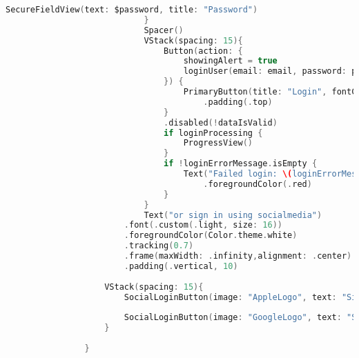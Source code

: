 \begin{minipage}{\textwidth}
\begin{lstlisting}[language=swift]
                                SecureFieldView(text: $password, title: "Password")
                            }
                            Spacer()
                            VStack(spacing: 15){
                                Button(action: {
                                    showingAlert = true
                                    loginUser(email: email, password: password)
                                }) {
                                    PrimaryButton(title: "Login", fontColor: Color.theme.white, backgroundColor: buttonColor)
                                        .padding(.top)
                                }
                                .disabled(!dataIsValid)
                                if loginProcessing {
                                    ProgressView()
                                }
                                if !loginErrorMessage.isEmpty {
                                    Text("Failed login: \(loginErrorMessage)")
                                        .foregroundColor(.red)
                                }
                            }
                            Text("or sign in using socialmedia")
                        .font(.custom(.light, size: 16))
                        .foregroundColor(Color.theme.white)
                        .tracking(0.7)
                        .frame(maxWidth: .infinity,alignment: .center)
                        .padding(.vertical, 10)
                    
                    VStack(spacing: 15){
                        SocialLoginButton(image: "AppleLogo", text: "Sing in with AppleID")
                            
                        SocialLoginButton(image: "GoogleLogo", text: "Sign in with Google")
                    }
                
                }
                
    \end{lstlisting}   
\end{minipage}

